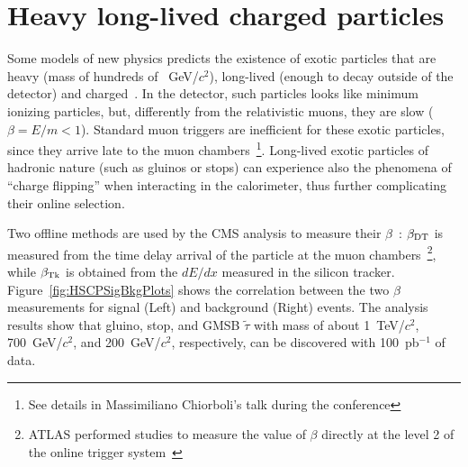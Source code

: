 \documentclass{cimento}
\begin{document}
\section{Heavy long-lived charged particles} \label{HSCP}
Some models of new physics 
predicts the existence of exotic particles that are 
heavy (mass of hundreds of ~GeV/$c^2$), long-lived
(enough to decay outside of the detector) and charged~\cite{Fairbairn:2006gg}. 
In the detector, such particles looks like 
minimum ionizing particles, but, differently from the 
relativistic muons, they are slow ($\beta=E/m<1$). 
Standard muon triggers are inefficient for these exotic particles, 
since they arrive late to the muon chambers~\footnote{See details 
in Massimiliano Chiorboli's talk during the conference}. 
Long-lived exotic particles of hadronic nature (such as gluinos or stops) 
can experience also the phenomena of ``charge flipping'' when interacting 
in the calorimeter, thus further complicating their online selection.

Two offline methods are used by the 
CMS analysis to measure their $\beta$~\cite{HSCP}:
$\beta_{{\rm DT}}$ is measured from the time delay arrival of the particle
at the muon chambers~\footnote{ATLAS performed studies to measure 
the value of $\beta$ directly at the level 2 of the online 
trigger system~\cite{Aad:2009wy}}, while $\beta_{{\rm Tk}}$ 
is obtained from the $dE/dx$ measured in the silicon tracker. 
Figure~\ref{fig:HSCPSigBkgPlots} shows the correlation between 
the two $\beta$ measurements for signal (Left) 
and background (Right) events. The analysis results show that 
gluino, stop, and GMSB $\tilde{\tau}$  with mass of about 
1~TeV/$c^2$, 700~GeV/$c^2$, and 200~GeV/$c^2$, 
respectively, can be discovered with 100~pb$^{-1}$ of data.
\end{document}
